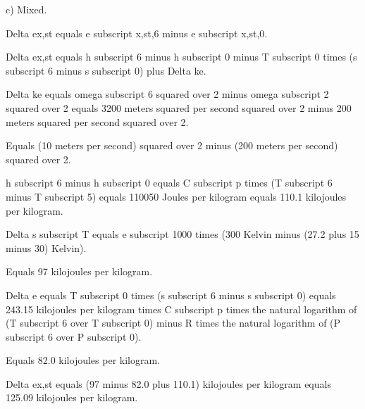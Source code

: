 c) Mixed.

Delta ex,st equals e subscript x,st,6 minus e subscript x,st,0.

Delta ex,st equals h subscript 6 minus h subscript 0 minus T subscript 0 times (s subscript 6 minus s subscript 0) plus Delta ke.

Delta ke equals omega subscript 6 squared over 2 minus omega subscript 2 squared over 2 equals 3200 meters squared per second squared over 2 minus 200 meters squared per second squared over 2.

Equals (10 meters per second) squared over 2 minus (200 meters per second) squared over 2.

h subscript 6 minus h subscript 0 equals C subscript p times (T subscript 6 minus T subscript 5) equals 110050 Joules per kilogram equals 110.1 kilojoules per kilogram.

Delta s subscript T equals e subscript 1000 times (300 Kelvin minus (27.2 plus 15 minus 30) Kelvin).

Equals 97 kilojoules per kilogram.

Delta e equals T subscript 0 times (s subscript 6 minus s subscript 0) equals 243.15 kilojoules per kilogram times C subscript p times the natural logarithm of (T subscript 6 over T subscript 0) minus R times the natural logarithm of (P subscript 6 over P subscript 0).

Equals 82.0 kilojoules per kilogram.

Delta ex,st equals (97 minus 82.0 plus 110.1) kilojoules per kilogram equals 125.09 kilojoules per kilogram.